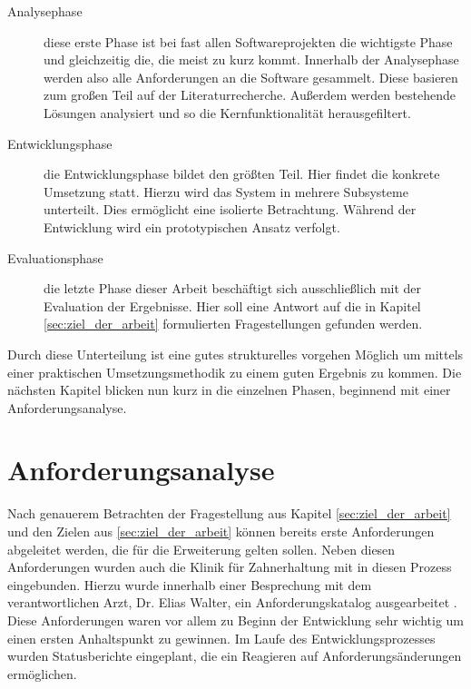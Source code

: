 \begin{description}
	\item[Analysephase] diese erste Phase ist bei fast allen Softwareprojekten die
		wichtigste Phase und gleichzeitig die, die meist zu kurz kommt. Innerhalb der
		Analysephase werden also alle Anforderungen an die Software gesammelt. Diese
		basieren zum großen Teil auf der Literaturrecherche. Außerdem werden bestehende
		Lösungen analysiert und so die Kernfunktionalität herausgefiltert.

	\item[Entwicklungsphase] die Entwicklungsphase bildet den größten Teil. Hier
		findet die konkrete Umsetzung statt. Hierzu wird das System in mehrere Subsysteme
		unterteilt. Dies ermöglicht eine isolierte Betrachtung. Während der Entwicklung
		wird ein prototypischen Ansatz verfolgt.

	\item[Evaluationsphase] die letzte Phase dieser Arbeit beschäftigt sich ausschließlich
		mit der Evaluation der Ergebnisse. Hier soll eine Antwort auf die in Kapitel
		\ref{sec:ziel_der_arbeit} formulierten Fragestellungen gefunden werden.
\end{description}

Durch diese Unterteilung ist eine gutes strukturelles vorgehen Möglich um
mittels einer praktischen Umsetzungsmethodik zu einem guten Ergebnis zu kommen. Die
nächsten Kapitel blicken nun kurz in die einzelnen Phasen, beginnend mit einer
Anforderungsanalyse.

\section{Anforderungsanalyse}
\label{sec:anforderungsanalyse} Nach genauerem Betrachten der Fragestellung aus
Kapitel \ref{sec:ziel_der_arbeit} und den Zielen aus \ref{sec:ziel_der_arbeit}
können bereits erste Anforderungen abgeleitet werden, die für die Erweiterung gelten
sollen. Neben diesen Anforderungen wurden auch die Klinik für Zahnerhaltung mit
in diesen Prozess eingebunden. Hierzu wurde innerhalb einer Besprechung mit dem verantwortlichen
Arzt, Dr. Elias Walter, ein Anforderungskatalog ausgearbeitet \citep[vgl.][]{walter2025}.
Diese Anforderungen waren vor allem zu Beginn der Entwicklung sehr wichtig um
einen ersten Anhaltspunkt zu gewinnen. Im Laufe des Entwicklungsprozesses wurden
Statusberichte eingeplant, die ein Reagieren auf Anforderungsänderungen
ermöglichen.

